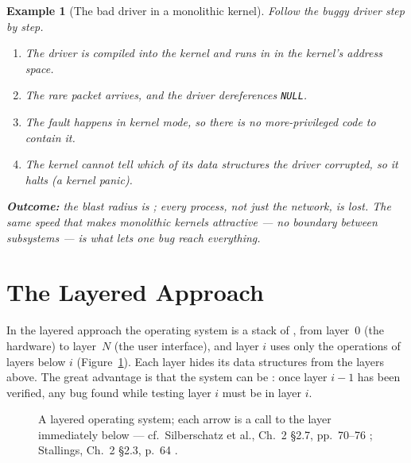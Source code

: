 \documentclass[11pt]{article}
\newtheorem{example}{Example}
\begin{document}
\begin{example}[The bad driver in a monolithic kernel]
Follow the buggy driver step by step.
\begin{enumerate}
  \item The driver is compiled into the kernel and runs in 
        in the kernel's address space.
  \item The rare packet arrives, and the driver dereferences \texttt{NULL}.
  \item The fault happens in kernel mode, so there is no more-privileged code
        to contain it.
  \item The kernel cannot tell which of its data structures the driver
        corrupted, so it halts (a \emph{kernel panic}).
\end{enumerate}
\textbf{Outcome:} the blast radius is ; every process,
not just the network, is lost. The same speed that makes monolithic kernels
attractive --- no boundary between subsystems --- is what lets one bug reach
everything.
\end{example}

\section{The Layered Approach}

\noindent{}

In the layered approach the operating system is a stack of , from
layer~0 (the hardware) to layer~$N$ (the user interface), and layer $i$ uses
only the operations of layers below $i$ (Figure~\ref{fig:layers}). Each layer
hides its data structures from the layers above. The great advantage is that
the system can be : once layer $i-1$ has been
verified, any bug found while testing layer $i$ must be in layer $i$.

\begin{figure}[h]
\centering
{}
\caption{A layered operating system; each arrow is a call to the layer
immediately below --- cf.\ Silberschatz et al., Ch.~2 \S2.7, pp.~70--76
\cite{SilberschatzOSC_operating_system_concepts}; Stallings, Ch.~2 \S2.3,
p.~64 \cite{StallingsOS_internals_design_principles}.}
\label{fig:layers}
\end{figure}
\end{document}
